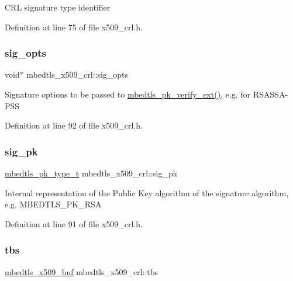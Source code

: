 C\+RL signature type identifier 

Definition at line 75 of file x509\+\_\+crl.\+h.

\mbox{\label{structmbedtls__x509__crl_ad59e3744b290f19d6400678d364aef77}} 
\subsubsection{\texorpdfstring{sig\+\_\+opts}{sig\_opts}}
{\footnotesize\ttfamily void$\ast$ mbedtls\+\_\+x509\+\_\+crl\+::sig\+\_\+opts}

Signature options to be passed to \mbox{\hyperlink{pk_8h_a81f0c5e40b839f5eca676c2c2752036f}{mbedtls\+\_\+pk\+\_\+verify\+\_\+ext()}}, e.\+g. for R\+S\+A\+S\+S\+A-\/\+P\+SS 

Definition at line 92 of file x509\+\_\+crl.\+h.

\mbox{\label{structmbedtls__x509__crl_a8c94375266c53f6e73d0134dc978151a}} 
\subsubsection{\texorpdfstring{sig\+\_\+pk}{sig\_pk}}
{\footnotesize\ttfamily \mbox{\hyperlink{pk_8h_a3fe41eff5605ae727eb9d28dad297020}{mbedtls\+\_\+pk\+\_\+type\+\_\+t}} mbedtls\+\_\+x509\+\_\+crl\+::sig\+\_\+pk}

Internal representation of the Public Key algorithm of the signature algorithm, e.\+g. M\+B\+E\+D\+T\+L\+S\+\_\+\+P\+K\+\_\+\+R\+SA 

Definition at line 91 of file x509\+\_\+crl.\+h.

\mbox{\label{structmbedtls__x509__crl_ab8086dd1a2a3d82363cc91e1cdfb5850}} 
\subsubsection{\texorpdfstring{tbs}{tbs}}
{\footnotesize\ttfamily \mbox{\hyperlink{group__x509__module_ga4d02c9e8e4e2934555e0d132cd2976dc}{mbedtls\+\_\+x509\+\_\+buf}} mbedtls\+\_\+x509\+\_\+crl\+::tbs}

